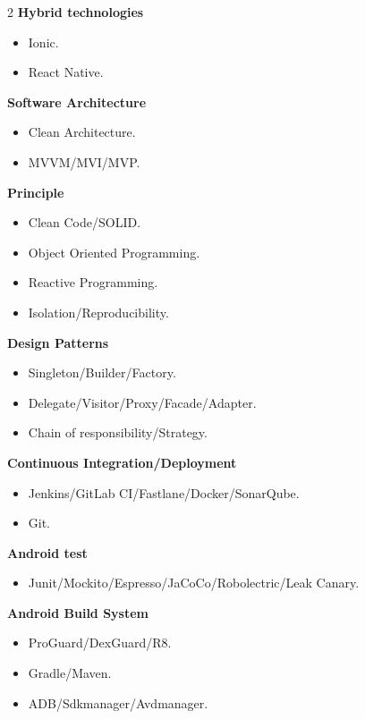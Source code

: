 \documentclass[10pt,a4paper,withhyper]{altacv}
\begin{document}
\begin{paracol}{2}
\textbf{Hybrid technologies}

\begin{itemize}
	\item Ionic.
	\item React Native.
\end{itemize}
\divider

\textbf{Software Architecture}

\begin{itemize}
	\item Clean Architecture.
	\item MVVM/MVI/MVP.
\end{itemize}
\divider

\textbf{Principle}

\begin{itemize}
	\item Clean Code/SOLID.
	\item Object Oriented Programming.
	\item Reactive Programming.
	\item Isolation/Reproducibility.
\end{itemize}
\divider

\textbf{Design Patterns}

\begin{itemize}
	\item Singleton/Builder/Factory.
	\item Delegate/Visitor/Proxy/Facade/Adapter.
	\item Chain of responsibility/Strategy.
\end{itemize}
\divider

\textbf{Continuous Integration/Deployment}

\begin{itemize}
	\item Jenkins/GitLab CI/Fastlane/Docker/SonarQube.
	\item Git.
\end{itemize}
\divider

\textbf{Android test}

\begin{itemize}
	\item Junit/Mockito/Espresso/JaCoCo/Robolectric/Leak Canary.
\end{itemize}
\divider

\textbf{Android Build System}

\begin{itemize}
	\item ProGuard/DexGuard/R8.
	\item Gradle/Maven.
	\item ADB/Sdkmanager/Avdmanager.
\end{itemize}
\divider


\end{paracol}
\end{document}

